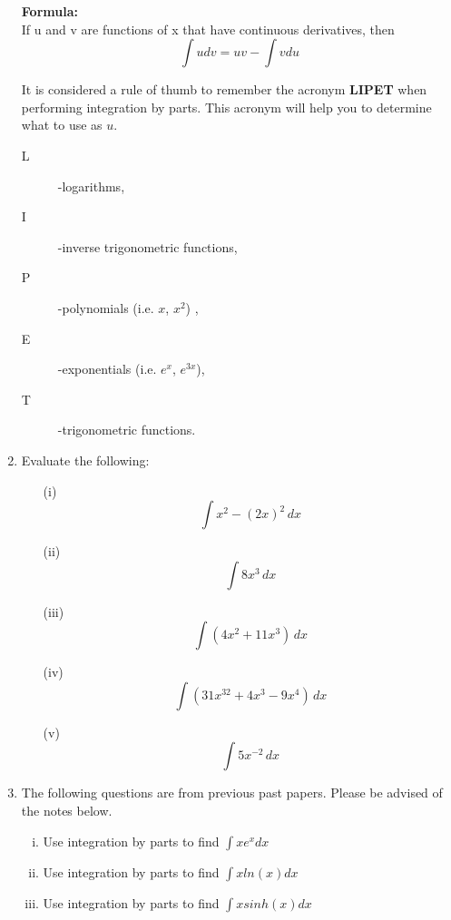 \documentclass[a4paper,12pt]{article}
\begin{document}
\begin{enumerate}
\begin{framed}
\noindent	\textbf{Formula:} \\ If u and v are functions of x that have continuous derivatives,
	then
	\[\int udv = uv - \int vdu\]
\end{framed}

\begin{framed}
It is considered a rule of thumb to remember the acronym \textbf{LIPET}
when performing integration by parts. This acronym will help you to determine
what to use as $u$. 


\begin{description}
	\item[L]-logarithms, 
	\item[I]-inverse trigonometric functions,
	\item[P]-polynomials (i.e. $x$, $x^2$) , 
	\item[E]-exponentials (i.e. $e^x$, $e^{3x}$), 
	\item[T]-trigonometric functions.
\end{description}
\end{framed}


\item 
Evaluate the following:
\begin{multicols}{2}
	\begin{itemize}
		
		\item[(i)] \[\int x^2-(2x)^{2}\, dx\]
		\item[(ii)] \[\int 8x^3\, dx\]
		\item[(iii)]\[ \int (4x^2+11x^3)\, dx\]
		\item[(iv)] \[\int (31x^{32}+4x^3-9x^4) \,dx\]
		\item[(v)] \[\int 5x^{-2}\, dx\]
	\end{itemize}
\end{multicols}

\item The following questions are from previous past papers. Please be advised of the notes below.
\begin{enumerate}[(i)]
	\item Use integration by parts to find $\displaystyle{\int xe^xdx}$ 
	
	\item Use integration by parts to find $\displaystyle{\int x ln(x) dx}$ 
	
	\item Use integration by parts to find $\displaystyle{\int x sinh(x) dx}$ 
	

\end{enumerate}
\end{enumerate}
\end{document}
